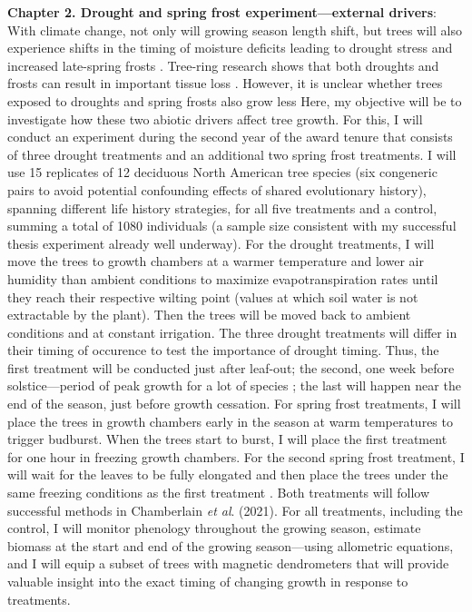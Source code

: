 \documentclass[12pt]{article}
\begin{document}
\textbf{Chapter 2. Drought and spring frost experiment---external drivers}:
With climate change, not only will growing season length shift, but trees will also experience shifts in the timing of moisture deficits leading to drought stress and increased late-spring frosts \cite{dox_wood_2022}. Tree-ring research shows that both droughts and frosts can result in important tissue loss \cite{kramer_why_2012,baumgarten_no_2023,kramer_why_2012,dandrea_winters_2019}. However, it is unclear whether trees exposed to droughts and spring frosts also grow less \cite{chamberlain_late_2021,baumgarten_no_2023,lian_summer_2020,zhang_drought_2021}
Here, my objective will be to investigate how these two abiotic drivers affect tree growth. For this, I will conduct an experiment during the second year of the award tenure that consists of three drought treatments and an additional two spring frost treatments. I will use 15 replicates of 12 deciduous North American tree species (six congeneric pairs to avoid potential confounding effects of shared evolutionary history), spanning different life history strategies, for all five treatments and a control, summing a total of 1080 individuals (a sample size consistent with my successful thesis experiment already well underway). 
For the drought treatments, I will move the trees to growth chambers at a warmer temperature and lower air humidity than ambient conditions to maximize evapotranspiration rates until they reach their respective wilting point (values at which soil water is not extractable by the plant). Then the trees will be moved back to ambient conditions and at constant irrigation. The three drought treatments will differ in their timing of occurence to test the importance of drought timing. Thus, the first treatment will be conducted just after leaf-out; the second, one week before solstice---period of peak growth for a lot of species \cite{anderson-teixeira_carbon_2021,dorangeville_drought_2018,mcmahon_general_2015}; the last will happen near the end of the season, just before growth cessation. For spring frost treatments, I will place the trees in growth chambers early in the season at warm temperatures to trigger budburst. When the trees start to burst, I will place the first treatment for one hour in freezing growth chambers. For the second spring frost treatment, I will wait for the leaves to be fully elongated and then place the trees under the same freezing conditions as the first treatment \cite{zohner_increased_2018}. Both treatments will follow successful methods in Chamberlain \textit{et al}. (2021). For all treatments, including the control, I will monitor phenology throughout the growing season, estimate biomass at the start and end of the growing season---using allometric equations, and I will equip a subset of trees with magnetic dendrometers that will provide valuable insight into the exact timing of changing growth in response to treatments. 
\end{document}
